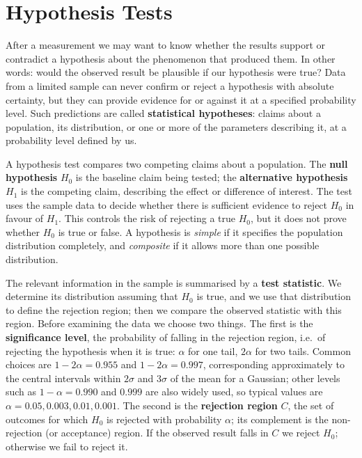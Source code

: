 \documentclass[letterpaper,11pt,leqno]{book}
\begin{document}
\section{Hypothesis Tests}
\label{sec:hypothesis_tests}

After a measurement we may want to know whether the results support or contradict a hypothesis about the phenomenon that produced them. In other words: would the observed result be plausible if our hypothesis were true? Data from a limited sample can never confirm or reject a hypothesis with absolute certainty, but they can provide evidence for or against it at a specified probability level. Such predictions are called \textbf{statistical hypotheses}: claims about a population, its distribution, or one or more of the parameters describing it, at a probability level defined by us.

A hypothesis test compares two competing claims about a population. The \textbf{null hypothesis} $H_0$ is the baseline claim being tested; the \textbf{alternative hypothesis} $H_1$ is the competing claim, describing the effect or difference of interest. The test uses the sample data to decide whether there is sufficient evidence to reject $H_0$ in favour of $H_1$. This controls the risk of rejecting a true $H_0$, but it does not prove whether $H_0$ is true or false. A hypothesis is \emph{simple} if it specifies the population distribution completely, and \emph{composite} if it allows more than one possible distribution.

The relevant information in the sample is summarised by a \textbf{test statistic}. We determine its distribution assuming that $H_0$ is true, and we use that distribution to define the rejection region; then we compare the observed statistic with this region. Before examining the data we choose two things. The first is the \textbf{significance level}, the probability of falling in the rejection region, i.e.\ of rejecting the hypothesis when it is true: $\alpha$ for one tail, $2\alpha$ for two tails. Common choices are $1 - 2\alpha = 0.955$ and $1 - 2\alpha = 0.997$, corresponding approximately to the central intervals within $2\sigma$ and $3\sigma$ of the mean for a Gaussian; other levels such as $1 - \alpha = 0.990$ and $0.999$ are also widely used, so typical values are $\alpha = 0.05, 0.003, 0.01, 0.001$. The second is the \textbf{rejection region} $C$, the set of outcomes for which $H_0$ is rejected with probability $\alpha$; its complement is the non-rejection (or acceptance) region. If the observed result falls in $C$ we reject $H_0$; otherwise we fail to reject it.
\end{document}
